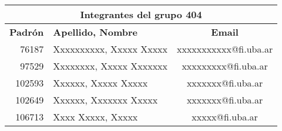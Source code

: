 \documentclass{standalone}
\begin{document}
\begin{tabular}{@{}rlc@{}}
    \multicolumn{3}{c}{Integrantes del grupo 404}                                 \\ \midrule
    \textbf{Padrón} & \textbf{Apellido, Nombre}           & \textbf{Email}        \\ \midrule
    76187           & Xxxxxxxxxx, Xxxxx Xxxxx     & xxxxxxxxxxx@fi.uba.ar \\
    97529           & Xxxxxxxx, Xxxxx Xxxxxxx     & xxxxxxxxx@fi.uba.ar   \\
    102593          & Xxxxxx, Xxxxx Xxxxx         & xxxxxxx@fi.uba.ar     \\
    102649          & Xxxxxx, Xxxxxxx Xxxxx       & xxxxxxx@fi.uba.ar     \\
    106713          & Xxxx Xxxxx, Xxxxx           & xxxxx@fi.uba.ar      \\ \bottomrule
    \end{tabular}
\end{document}
